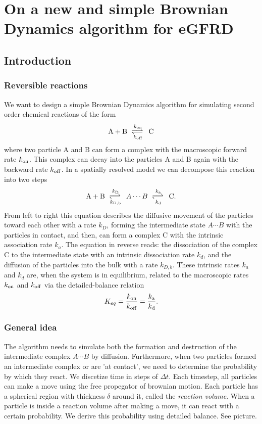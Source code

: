 \section{On a new and simple Brownian Dynamics algorithm for eGFRD}

\subsection{Introduction}

\subsubsection{Reversible reactions}
We want to design a simple Brownian Dynamics algorithm for simulating second order chemical reactions of the form
\begin{equation}
{\rm A} + {\rm B} \rates{k_{\rm on}}{k_{\rm off}} {\rm C}
\end{equation}
where two particle A and B can form a complex with the macroscopic forward rate $k_{\rm on}$. This complex can decay into the particles A and B again with the backward rate $k_{\rm off}$. In a spatially resolved model we can decompose this reaction into two steps \cite{Agmon1990}
\begin{equation}
{\rm A} + {\rm B} \rates{k_{\rm D}}{k_{\rm D,b}} A \cdots B \rates{k_{\rm a}}{k_{\rm d}} {\rm C}.
\end{equation}
From left to right this equation describes the diffusive movement of the particles toward each other with a rate $k_D$, forming the intermediate state $A \cdots B$ with the particles in contact, and then, can form a complex C with the intrinsic association rate $k_a$. The equation in reverse reads: the dissociation of the complex C to the intermediate state with an intrinsic dissociation rate $k_d$, and the diffusion of the particles into the bulk with a rate $k_{D,b}$. These intrinsic rates $k_a$ and $k_d$ are, when the system is in equilibrium, related to the macroscopic rates $k_{\rm on}$ and $k_{\rm off}$ via the detailed-balance relation
\begin{equation}
K_{eq} = \frac{k_{\rm on}}{k_{\rm off}} = \frac{k_{\rm a}}{k_{\rm d}}.
\end{equation}

\subsubsection{General idea}
The algorithm needs to simulate both the formation and destruction of the intermediate complex $A\cdots B$ by diffusion. Furthermore, when two particles formed an intermediate complex or are 'at contact', we need to determine the probability by which they react. We discetize time in steps of $\Delta t$. Each timestep, all particles can make a move using the free propegator of brownian motion. Each particle has a spherical region with thickness $\delta$ around it, called the \emph{reaction volume}. When a particle is inside a reaction volume after making a move, it can react with a certain probability. We derive this probability using detailed balance. See picture.


